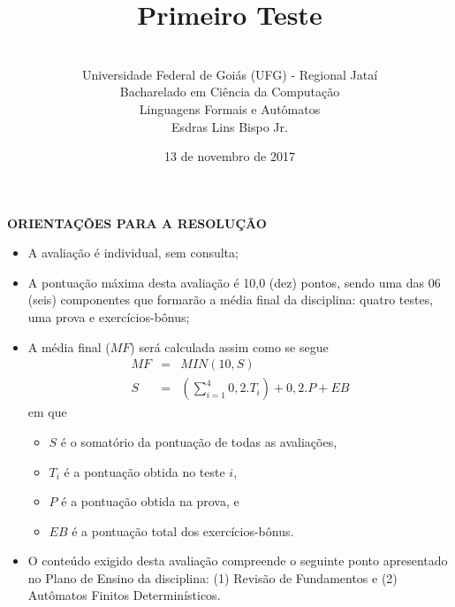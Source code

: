 \documentclass[12pt,a4paper,oneside]{article}
\author{\\Universidade Federal de Goiás (UFG) - Regional  Jataí\\Bacharelado em Ciência da Computação \\Linguagens Formais e Autômatos \\Esdras Lins Bispo Jr.}
\date{13 de novembro de 2017}
\title{\sc \huge Primeiro Teste}
\begin{document}
\maketitle

{\bf ORIENTAÇÕES PARA A RESOLUÇÃO}

\small
 
\begin{itemize}
	\item A avaliação é individual, sem consulta;
	\item A pontuação máxima desta avaliação é 10,0 (dez) pontos, sendo uma das 06 (seis) componentes que formarão a média final da disciplina: quatro testes, uma prova e exercícios-bônus;
	\item A média final ($MF$) será calculada assim como se segue
	\begin{eqnarray}
		MF & = & MIN(10, S) \nonumber \\
		S & = & (\sum_{i=1}^{4} 0,2.T_i ) + 0,2.P  + EB\nonumber
	\end{eqnarray}
	em que 
	\begin{itemize}
		\item $S$ é o somatório da pontuação de todas as avaliações,
		\item $T_i$ é a pontuação obtida no teste $i$,
		\item $P$ é a pontuação obtida na prova, e
		\item $EB$ é a pontuação total dos exercícios-bônus.
	\end{itemize}
	\item O conteúdo exigido desta avaliação compreende o seguinte ponto apresentado no Plano de Ensino da disciplina: (1) Revisão de Fundamentos e (2) Autômatos Finitos Determinísticos.
\end{itemize}

\begin{center}
\end{center}

\newpage
\end{document}
